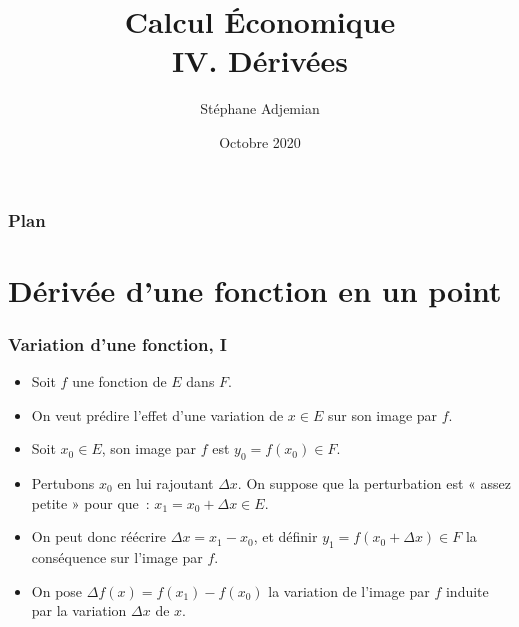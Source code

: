 \documentclass[10pt,notheorems]{beamer}
\theoremstyle{plain}
\theoremstyle{definition} %
\begin{document}
\title{Calcul Économique\\\small{IV. Dérivées}}
\author[S. Adjemian]{Stéphane Adjemian}
 \date{Octobre 2020}

\begin{frame}
  \titlepage{}
\end{frame}

\begin{frame}
  \frametitle{Plan}
  \tableofcontents
\end{frame}


\section{Dérivée d'une fonction en un point}

\begin{frame}
  \frametitle{Variation d'une fonction, I}
  \hypertarget{slide_variation_1}{}

  \begin{itemize}

  \item Soit $f$ une fonction de $E$ dans $F$.\newline

  \item On veut prédire l'effet d'une variation de $x\in E$ sur son image par $f$.\newline

  \item Soit $x_0\in E$, son image par $f$ est $y_0 = f(x_0)\in F$.\newline

  \item Pertubons $x_0$ en lui rajoutant $\Delta x$. On suppose que la perturbation est « assez petite » pour que~: $x_1=x_0+\Delta x \in E$.\newline

  \item On peut donc réécrire $\Delta x = x_1-x_0$, et définir $y_1 = f(x_0+\Delta x)\in F$ la conséquence sur l'image par $f$.\newline

  \item On pose $\Delta f(x) = f(x_1)-f(x_0)$ la variation de l'image par $f$ induite par la variation $\Delta x$ de $x$.

  \end{itemize}

\end{frame}
\end{document}
